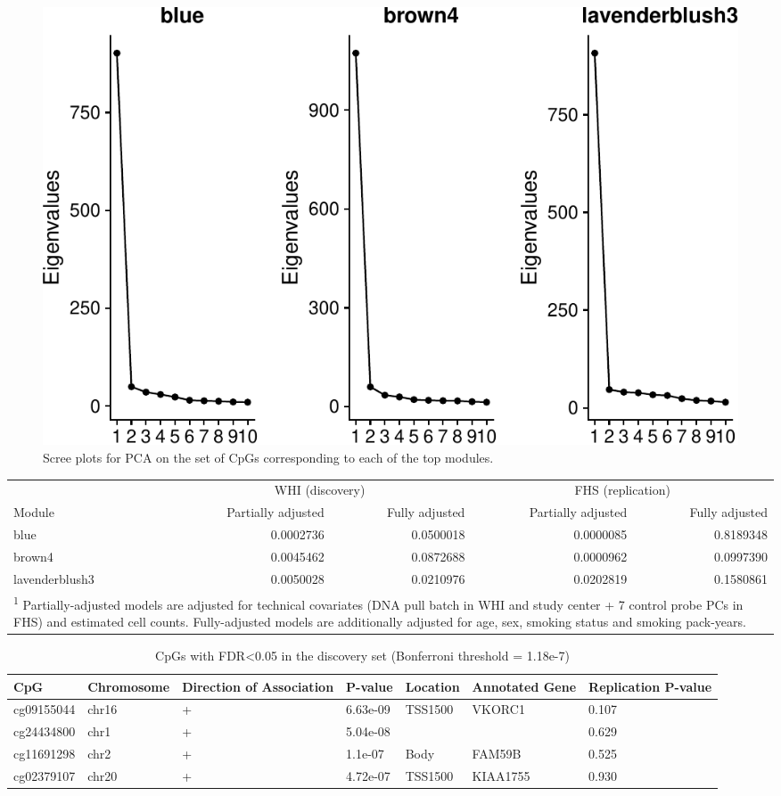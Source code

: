 \documentclass[]{article}
\theoremstyle{definition}
\theoremstyle{definition}
\theoremstyle{definition}
\theoremstyle{remark}
\begin{document}
\begin{figure}[htbp]
\centering
\includegraphics{../doc/figures/print-scree-plots-1.pdf}
\caption{\label{fig:print-scree-plots}Scree plots for PCA on the set of CpGs
corresponding to each of the top modules.}
\end{figure}

\begin{tabular}{lrrrr}
\toprule
\multicolumn{1}{c}{} & \multicolumn{2}{c}{WHI (discovery)} & \multicolumn{2}{c}{FHS (replication)} \\
\cmidrule(l{2pt}r{2pt}){2-3} \cmidrule(l{2pt}r{2pt}){4-5}
Module & Partially adjusted & Fully adjusted & Partially adjusted & Fully adjusted\\
\midrule
blue & 0.0002736 & 0.0500018 & 0.0000085 & 0.8189348\\
brown4 & 0.0045462 & 0.0872688 & 0.0000962 & 0.0997390\\
lavenderblush3 & 0.0050028 & 0.0210976 & 0.0202819 & 0.1580861\\
\bottomrule
\multicolumn{5}{l}{\textsuperscript{1} Partially-adjusted models are adjusted for technical covariates (DNA pull batch in WHI and study center + 7 control probe PCs in FHS) and estimated cell counts. Fully-adjusted models are additionally adjusted for age, sex, smoking status and smoking pack-years.}\\
\end{tabular}

\begin{table}

\caption{\label{tab:ewas-cpgs}CpGs with FDR<0.05 in the discovery set (Bonferroni threshold = 1.18e-7)}
\centering
\begin{tabular}[t]{lllllll}
\toprule
CpG & Chromosome & Direction of Association & P-value & Location & Annotated Gene & Replication P-value\\
\midrule
cg09155044 & chr16 & + & 6.63e-09 & TSS1500 & VKORC1 & 0.107\\
cg24434800 & chr1 & + & 5.04e-08 &  &  & 0.629\\
cg11691298 & chr2 & + & 1.1e-07 & Body & FAM59B & 0.525\\
cg02379107 & chr20 & + & 4.72e-07 & TSS1500 & KIAA1755 & 0.930\\
\bottomrule
\end{tabular}
\end{table}
\end{document}

